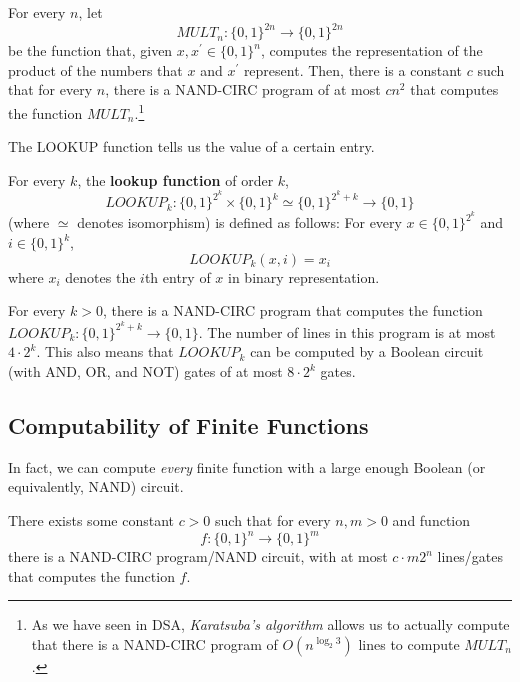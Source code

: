   \begin{theorem}
    For every $n$, let 
    \begin{equation}
      MULT_n : \{0,1\}^{2n} \longrightarrow \{0,1\}^{2n}
    \end{equation}
    be the function that, given $x, x^\prime \in \{0,1\}^n$, computes the representation of the product of the numbers that $x$ and $x^\prime$ represent. Then, there is a constant $c$ such that for every $n$, there is a NAND-CIRC program of at most $cn^2$ that computes the function $MULT_n$.\footnote{As we have seen in DSA, \textit{Karatsuba's algorithm} allows us to actually compute that there is a NAND-CIRC program of $O(n^{\log_2 3})$ lines to compute $MULT_n$. }
  \end{theorem}

  The LOOKUP function tells us the value of a certain entry. 

  \begin{definition}
    For every $k$, the \textbf{lookup function} of order $k$, 
    \[LOOKUP_k: \{0,1\}^{2^k} \times \{0,1\}^k \simeq \{0,1\}^{2^k + k} \longrightarrow \{0,1\}\]
    (where $\simeq$ denotes isomorphism) is defined as follows: For every $x \in \{0,1\}^{2^k}$ and $i \in \{0,1\}^k$, 
    \[LOOKUP_k (x, i) = x_i\]
    where $x_i$ denotes the $i$th entry of $x$ in binary representation. 
  \end{definition}

  \begin{theorem}
    For every $k > 0$, there is a NAND-CIRC program that computes the function $LOOKUP_k: \{0,1\}^{2^k + k} \longrightarrow \{0,1\}$. The number of lines in this program is at most $4 \cdot 2^k$. This also means that $LOOKUP_k$ can be computed by a Boolean circuit (with AND, OR, and NOT) gates of at most $8 \cdot 2^k$ gates. 
  \end{theorem}

\subsection{Computability of Finite Functions}

  In fact, we can compute \textit{every} finite function with a large enough Boolean (or equivalently, NAND) circuit. 

  \begin{theorem}
    There exists some constant $c > 0$ such that for every $n, m > 0$ and function
    \[f: \{0,1\}^n \longrightarrow \{0,1\}^m\]
    there is a NAND-CIRC program/NAND circuit,  with at most $c \cdot m 2^n$ lines/gates that computes the function $f$. 
  \end{theorem}

